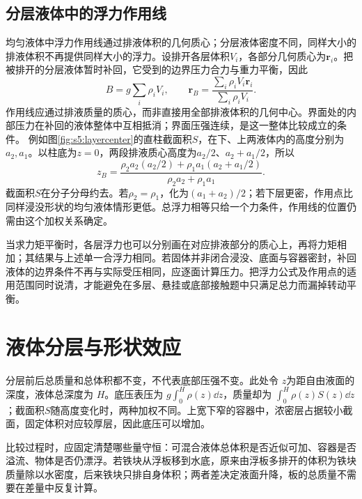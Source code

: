 \subsection{分层液体中的浮力作用线}
均匀液体中浮力作用线通过排液体积的几何质心；分层液体密度不同，同样大小的排液体积不再提供同样大小的浮力。设排开各层体积$V_i$，各部分几何质心为$\boldsymbol r_i$。把被排开的分层液体暂时补回，它受到的边界压力合力与重力平衡，因此
\[
B=g\sum_i\rho_iV_i,\qquad
\boldsymbol r_B=\frac{\sum_i\rho_iV_i\boldsymbol r_i}
{\sum_i\rho_iV_i}.
\]
作用线应通过排液质量的质心，而非直接用全部排液体积的几何中心。界面处的内部压力在补回的液体整体中互相抵消；界面压强连续，是这一整体比较成立的条件。
例如图\ref{fig:s5:layercenter}的直柱截面积$S$，在下、上两液体内的高度分别为$a_2,a_1$。以柱底为$z=0$，两段排液质心高度为$a_2/2$、$a_2+a_1/2$，所以
\[
z_B=\frac{\rho_2a_2(a_2/2)+\rho_1a_1(a_2+a_1/2)}
{\rho_2a_2+\rho_1a_1}.
\]
截面积$S$在分子分母约去。若$\rho_2=\rho_1$，化为$(a_1+a_2)/2$；若下层更密，作用点比同样浸没形状的均匀液体情形更低。总浮力相等只给一个力条件，作用线的位置仍需由这个加权关系确定。

当求力矩平衡时，各层浮力也可以分别画在对应排液部分的质心上，再将力矩相加；其结果与上述单一合浮力相同。若固体并非闭合浸没、底面与容器密封，补回液体的边界条件不再与实际受压相同，应逐面计算压力。把浮力公式及作用点的适用范围同时说清，才能避免在多层、悬挂或底部接触题中只满足总力而漏掉转动平衡。

\section{液体分层与形状效应}
分层前后总质量和总体积都不变，不代表底部压强不变。此处令 $z$为距自由液面的深度，液体总深度为 $H$。底压表压为 $g\int_0^H\rho(z)\dd z$，质量却为 $\int_0^H\rho(z)S(z)\dd z$；截面积$S$随高度变化时，两种加权不同。上宽下窄的容器中，浓密层占据较小截面，固定体积对应较厚层，因此底压可以增加。

比较过程时，应固定清楚哪些量守恒：可混合液体总体积是否近似可加、容器是否溢流、物体是否仍漂浮。若铁块从浮板移到水底，原来由浮板多排开的体积为铁块质量除以水密度，后来铁块只排自身体积；两者差决定液面升降，板的总质量不需要在差量中反复计算。

